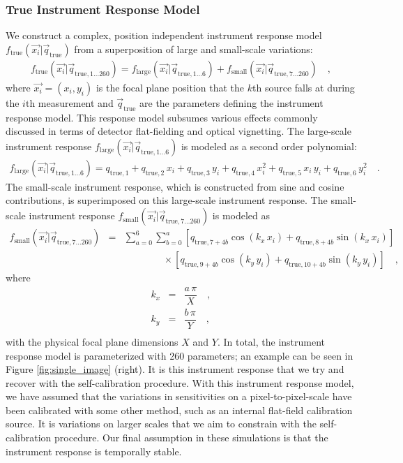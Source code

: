 \documentclass[preprint,pdftex]{aastex}
\newcommand{\true}{\text{true}}
\begin{document}
\subsubsection{True Instrument Response Model}
\label{sec:instrument_response_model}
We construct a complex, position independent instrument response model $f_\true(\vec{x_i} | \vec{q}_{\true})$ from a superposition of large and small-scale variations:
\begin{eqnarray*}
f_\true(\vec{x_i} | \vec{q}_{\true, 1 \ldots 260}) = f_\text{large}(\vec{x_i} | \vec{q}_{\true, 1 \ldots 6}) + f_\text{small}(\vec{x_i} | \vec{q}_{\true, 7 \ldots 260}) \quad ,
\end{eqnarray*}
where $\vec{x_i} = (x_i, y_i)$ is the focal plane position that the $k$th source falls at during the $i\text{th}$ measurement and $\vec{q}_\true$ are the parameters defining the instrument response model. This response model subsumes various effects commonly discussed in terms of detector flat-fielding and optical vignetting. The large-scale instrument response $f_\text{large}(\vec{x_i} | \vec{q}_{\true, 1 \ldots 6})$ is modeled as a second order polynomial:
\begin{eqnarray*}
f_\text{large}(\vec{x_i} | \vec{q}_{\true, 1 \ldots 6}) = q_{\true, 1} + q_{\true, 2} \, x_i + q_{\true, 3} \, y_i + q_{\true, 4} \, x_i^2 + q_{\true, 5} \, x_i \, y_i  + q_{\true, 6} \, y_i^2  \quad .
\end{eqnarray*}
The small-scale instrument response, which is constructed from sine and cosine contributions, is superimposed on this large-scale instrument response. The small-scale instrument response $f_\text{small}(\vec{x_i} | \vec{q}_{\true, 7 \ldots 260})$ is modeled as
\begin{eqnarray*}
f_\text{small}(\vec{x_i} | \vec{q}_{\true, 7\ldots 260})  & = &  \sum_{a=0}^6 \sum_{b=0}^a \left[ q_{\true, 7+4b} \cos (k_x \, x_i) + q_{\true, 8+4b} \sin (k_x \, x_i) \right] \\
& & \qquad \qquad \times \left[ q_{\true, 9+4b} \cos (k_y \, y_i) + q_{\true, 10+4b} \sin (k_y \, y_i) \right] \quad ,
\end{eqnarray*}
where
\begin{eqnarray*}
k_x & = & \dfrac{a \, \pi}{X} \quad ,\\
k_y & = & \dfrac{b \, \pi}{Y} \quad ,\\
\end{eqnarray*}
with the physical focal plane dimensions $X$ and $Y$. In total, the instrument response model is parameterized with 260 parameters; an example can be seen in Figure \ref{fig:single_image}      (right). It is this instrument response that we try and recover with the self-calibration procedure. With this instrument response model, we have assumed that the variations in sensitivities on a pixel-to-pixel-scale have been calibrated with some other method, such as an internal flat-field calibration source. It is variations on larger scales that we aim to constrain with the self-calibration procedure. Our final assumption in these simulations is that the instrument response is temporally stable. 
\end{document}

